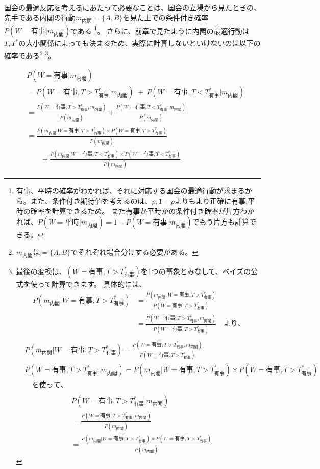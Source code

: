 \documentclass[main.tex]{subfiles}
\begin{document}
国会の最適反応を考えるにあたって必要なことは、国会の立場から見たときの、
先手である内閣の行動$m_{内閣}=\{A,B\}$を見た上での条件付き確率$P(W=有事|m_{内閣})$である
\footnote{
    有事、平時の確率がわかれば、それに対応する国会の最適行動が求まるから。また、条件付き期待値を考えるのは、$p,1-p$よりもより正確に有事,平時の確率を計算できるため。
    また有事か平時かの条件付き確率が片方わかれば、$P(W=平時|m_{内閣}) = 1-P(W=有事|m_{内閣})$でもう片方も計算できる。}。
さらに、前章で見たように内閣の最適行動は$T,T^*$の大小関係によっても決まるため、実際に計算しないといけないのは以下の確率である\footnote{$m_{内閣}$は$=\{A,B\}$でそれぞれ場合分けする必要がある。}
\footnote{最後の変換は、$(W=有事, T>T^*_{有事})$を1つの事象とみなして、ベイズの公式を使って計算できます。
具体的には、
\begin{align*}
    P(m_{内閣}|W=有事, T>T^*_{有事})
    &= \frac{ P(m_{内閣}, W=有事, T>T^*_{有事}) }{ P(W=有事, T>T^*_{有事}) }\\
    &= \frac{ P(W=有事, T>T^*_{有事},m_{内閣}) }{ P(W=有事, T>T^*_{有事}) } \quad {より、}\\
\end{align*}
\begin{align*}
    & P(m_{内閣}|W=有事, T>T^*_{有事}) = \frac{ P(W=有事, T>T^*_{有事},m_{内閣}) }{ P(W=有事, T>T^*_{有事})}\\
    & P(W=有事, T>T^*_{有事},m_{内閣}) = P(m_{内閣}|W=有事, T>T^*_{有事}) × P(W=有事, T>T^*_{有事})\\
    & \quad {を使って、}\\
\end{align*}
\begin{align*}
    & P(W=有事, T>T^*_{有事}|m_{内閣}) \\
    &= \frac{ P(W=有事, T>T^*_{有事}, m_{内閣}) }{ P(m_{内閣}) }\\
    &= \frac{ P(m_{内閣}|W=有事, T>T^*_{有事}) × P(W=有事, T>T^*_{有事}) }{ P(m_{内閣}) }
\end{align*}
}。


\begin{align*}
    &  P(W=有事|m_{内閣})\\
    &= P(W=有事, T>T^*_{有事}|m_{内閣}) \;+\; P(W=有事, T<T^*_{有事}|m_{内閣})\\[0.5em]
    &= \frac{ P(W=有事, T>T^*_{有事}, m_{内閣}) }{ P(m_{内閣}) } + \frac{ P(W=有事, T<T^*_{有事},m_{内閣}) }{ P(m_{内閣}) }\\[1em]
    &= \frac{ P(m_{内閣} | W=有事, T>T^*_{有事}) × P(W=有事, T>T^*_{有事}) }{ P(m_{内閣}) }\\[0.5em]
    &\quad\quad + \frac{ P(m_{内閣} | W=有事, T<T^*_{有事}) × P(W=有事, T<T^*_{有事}) }{ P(m_{内閣}) }   
\end{align*}
\end{document}
